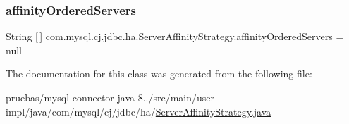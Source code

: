 \subsubsection{\texorpdfstring{affinity\+Ordered\+Servers}{affinityOrderedServers}}
{\footnotesize\ttfamily String \mbox{[}$\,$\mbox{]} com.\+mysql.\+cj.\+jdbc.\+ha.\+Server\+Affinity\+Strategy.\+affinity\+Ordered\+Servers = null}



The documentation for this class was generated from the following file\+:\begin{DoxyCompactItemize}
\item 
pruebas/mysql-\/connector-\/java-\/8../src/main/user-\/impl/java/com/mysql/cj/jdbc/ha/\mbox{\hyperlink{_server_affinity_strategy_8java}{Server\+Affinity\+Strategy.\+java}}\end{DoxyCompactItemize}
